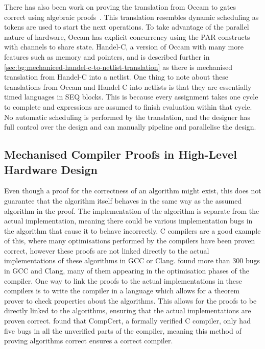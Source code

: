 There has also been work on proving the translation from Occam to
gates~\cite{page91_compil_occam} correct using algebraic
proofs~\cite{jifeng93_towar}.  This translation resembles dynamic scheduling as
tokens are used to start the next operations.  To take advantage of the parallel
nature of hardware, Occam has explicit concurrency using the PAR constructs with
channels to share state.  Handel-C, a version of Occam with many more features
such as memory and pointers, and is described further in
\cref{sec:bg:mechaniced-handel-c-to-netlist-translation} as there is mechanised
translation from Handel-C into a netlist.  One thing to note about these
translations from Occam and Handel-C into netlists is that they are essentially
timed languages in SEQ blocks.  This is because every assignment takes one cycle
to complete and expressions are assumed to finish evaluation within that cycle.
No automatic scheduling is performed by the translation, and the designer has
full control over the design and can manually pipeline and parallelise the
design.

\subsection{Mechanised Compiler Proofs in High-Level Hardware Design}%
\label{sec:bg:mechanised-compiler-proofs}

Even though a proof for the correctness of an algorithm might exist, this does
not guarantee that the algorithm itself behaves in the same way as the assumed
algorithm in the proof.  The implementation of the algorithm is separate from
the actual implementation, meaning there could be various implementation bugs in
the algorithm that cause it to behave incorrectly.  C compilers are a good
example of this, where many optimisations performed by the compilers have been
proven correct, however these proofs are not linked directly to the actual
implementations of these algorithms in GCC or Clang.
\textcite{yang11_findin_under_bugs_c_compil} found more than 300 bugs in GCC and
Clang, many of them appearing in the optimisation phases of the compiler.  One
way to link the proofs to the actual implementations in these compilers is to
write the compiler in a language which allows for a theorem prover to check
properties about the algorithms.  This allows for the proofs to be directly
linked to the algorithms, ensuring that the actual implementations are proven
correct.  \citeauthor{yang11_findin_under_bugs_c_compil} found that CompCert, a
formally verified C compiler, only had five bugs in all the unverified parts of
the compiler, meaning this method of proving algorithms correct ensures a
correct compiler.

